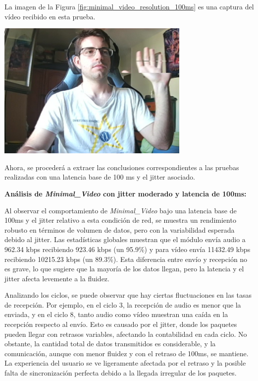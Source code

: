 \newpage
La imagen de la Figura \ref{fig:minimal_video_resolution_100ms} es una captura del vídeo recibido en esta prueba.
\begin{center}
  \includegraphics[width = 0.7\textwidth]{images/VideoRecibido5.3.png}
  \label{fig:minimal_video_resolution_100ms}
\end{center}

\newpage

Ahora, se procederá a extraer las conclusiones correspondientes a las pruebas realizadas con una latencia base de 100 ms y el jitter asociado.
\vspace{\baselineskip}

\textbf{Análisis de \textit{Minimal\_Video} con jitter moderado y latencia de 100ms:}
\vspace{\baselineskip}

Al observar el comportamiento de \textit{Minimal\_Video} bajo una latencia base de 100ms y el jitter relativo a esta condición de red, se muestra un rendimiento robusto en términos de volumen de datos, pero con la variabilidad esperada debido al jitter. Las estadísticas globales muestran que el módulo envía audio a 962.34 kbps recibiendo 923.46 kbps (un 95.9\%) y para vídeo envía 11432.49 kbps recibiendo 10215.23 kbps (un 89.3\%). Esta diferencia entre envío y recepción no es grave, lo que sugiere que la mayoría de los datos llegan, pero la latencia y el jitter afecta levemente a la fluidez.
\vspace{\baselineskip}

Analizando los ciclos, se puede observar que hay ciertas fluctuaciones en las tasas de recepción. Por ejemplo, en el ciclo 3, la recepción de audio es menor que la enviada, y en el ciclo 8, tanto audio como vídeo muestran una caída en la recepción respecto al envío. Esto es causado por el jitter, donde los paquetes pueden llegar con retrasos variables, afectando la contabilidad en cada ciclo. No obstante, la cantidad total de datos transmitidos es considerable, y la comunicación, aunque con menor fluidez y con el retraso de 100ms, se mantiene. La experiencia del usuario se ve ligeramente afectada por el retraso y la posible falta de sincronización perfecta debido a la llegada irregular de los paquetes.

